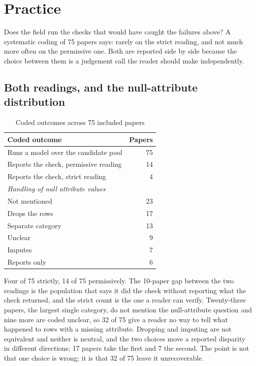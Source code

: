 \section{Practice}
\label{sec:res-rq5}

Does the field run the checks that would have caught the failures above? A
systematic coding of 75 papers says: rarely on the strict reading, and not much
more often on the permissive one. Both are reported side by side because the
choice between them is a judgement call the reader should make independently.

\subsection{Both readings, and the null-attribute distribution}

\begin{table}[H]
\caption{Coded outcomes across 75 included papers}
\centering
\small
\begin{tabular}{lr}
\toprule
\textbf{Coded outcome} & \textbf{Papers} \\
\midrule
Runs a model over the candidate pool  & 75 \\
Reports the check, permissive reading & 14 \\
Reports the check, strict reading     & 4  \\
\midrule
\multicolumn{2}{l}{\textit{Handling of null attribute values}} \\
Not mentioned     & 23 \\
Drops the rows    & 17 \\
Separate category & 13 \\
Unclear           & 9  \\
Imputes           & 7  \\
Reports only      & 6  \\
\bottomrule
\end{tabular}
\label{tab:survey}
\end{table}

Four of 75 strictly, 14 of 75 permissively. The 10-paper gap between the two
readings is the population that says it did the check without reporting what the
check returned, and the strict count is the one a reader can verify. Twenty-three
papers, the largest single category, do not mention the null-attribute question
and nine more are coded unclear, so 32 of 75 give a reader no way to tell what
happened to rows with a missing attribute. Dropping and imputing are not
equivalent and neither is neutral, and the two choices move a reported disparity
in different directions; 17 papers take the first and 7 the second. The point is
not that one choice is wrong; it is that 32 of 75 leave it unrecoverable.

